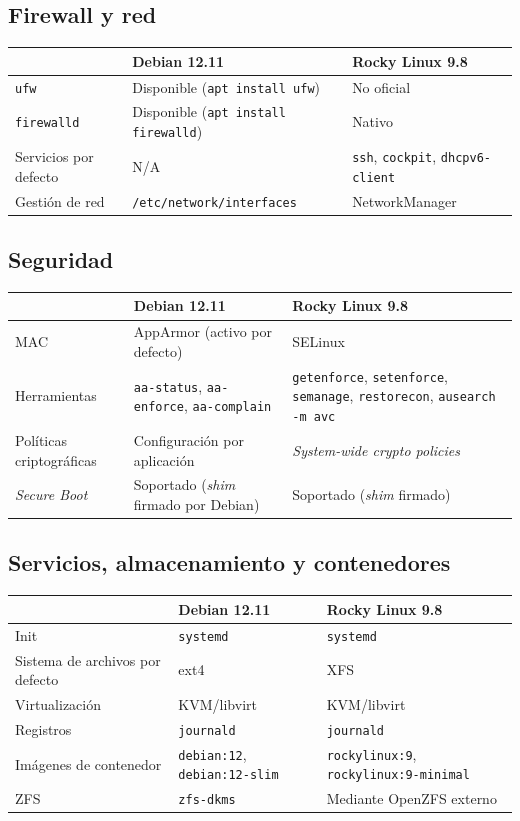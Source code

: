 \documentclass[11pt,letterpaper]{article}
\newcommand{\f}[1]{\texttt{#1}}
\newcommand{\enc}[1]{\textbf{#1}}
\begin{document}
\subsection{Firewall y red}
\begin{center}
\begin{tabular}{p{4cm}p{4.8cm}p{5.5cm}}
\toprule
 & \enc{Debian 12.11} & \enc{Rocky Linux 9.8} \\
\midrule
\f{ufw} & Disponible (\f{apt install ufw}) & No oficial \\
\f{firewalld} & Disponible (\f{apt install firewalld}) & Nativo \\
Servicios por defecto & N/A & \f{ssh}, \f{cockpit}, \f{dhcpv6-client} \\
Gestión de red & \f{/etc/network/interfaces} & NetworkManager \\
\bottomrule
\end{tabular}
\end{center}

\subsection{Seguridad}
\begin{center}
\begin{tabular}{p{3.3cm}p{5cm}p{6cm}}
\toprule
 & \enc{Debian 12.11} & \enc{Rocky Linux 9.8} \\
\midrule
MAC & AppArmor (activo por defecto) & SELinux \\
Herramientas & \f{aa-status}, \f{aa-enforce}, \f{aa-complain} & \f{getenforce}, \f{setenforce}, \f{semanage}, \f{restorecon}, \f{ausearch -m avc} \\
Políticas criptográficas & Configuración por aplicación & \textit{System-wide crypto policies} \\
\textit{Secure Boot} & Soportado (\textit{shim} firmado por Debian) & Soportado (\textit{shim} firmado) \\
\bottomrule
\end{tabular}
\end{center}

\subsection{Servicios, almacenamiento y contenedores}
\begin{center}
\begin{tabular}{p{3.8cm}p{4.6cm}p{5.6cm}}
\toprule
 & \enc{Debian 12.11} & \enc{Rocky Linux 9.8} \\
\midrule
Init & \f{systemd} & \f{systemd} \\
Sistema de archivos por defecto & ext4 & XFS \\
Virtualización & KVM/libvirt & KVM/libvirt \\
Registros & \f{journald} & \f{journald} \\
Imágenes de contenedor & \f{debian:12}, \f{debian:12-slim} & \f{rockylinux:9}, \f{rockylinux:9-minimal} \\
ZFS & \f{zfs-dkms} & Mediante OpenZFS externo \\
\bottomrule
\end{tabular}
\end{center}
\end{document}
